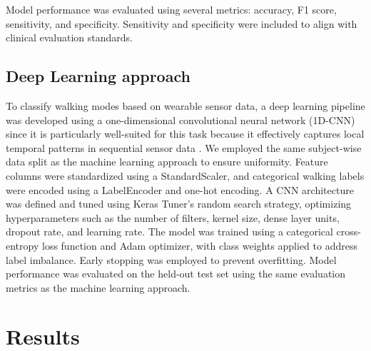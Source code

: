 \documentclass[sensors,article,submit,pdftex,moreauthors]{Definitions/mdpi}
\begin{document}
Model performance was evaluated using several metrics: accuracy, F1 score, sensitivity, and specificity. Sensitivity and specificity were included to align with clinical evaluation standards. 


\subsection{Deep Learning approach}

To classify walking modes based on wearable sensor data, a deep learning pipeline was developed using a one-dimensional convolutional neural network (1D-CNN) since it is particularly well-suited for this task because it effectively captures local temporal patterns in sequential sensor data \cite{ref1dcnn}. We employed the same subject-wise data split as the machine learning approach to ensure uniformity. Feature columns were standardized using a StandardScaler, and categorical walking labels were encoded using a LabelEncoder and one-hot encoding. A CNN architecture was defined and tuned using Keras Tuner’s random search strategy, optimizing hyperparameters such as the number of filters, kernel size, dense layer units, dropout rate, and learning rate. The model was trained using a categorical cross-entropy loss function and Adam optimizer, with class weights applied to address label imbalance. Early stopping was employed to prevent overfitting. Model performance was evaluated on the held-out test set using the same evaluation metrics as the machine learning approach.


\section{Results}
\label{sec:Results}
\end{document}
